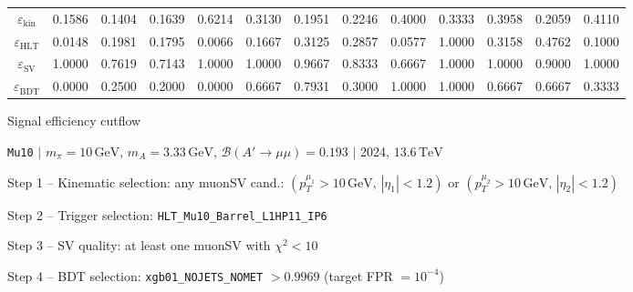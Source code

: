 \documentclass[10pt,a4paper]{article}
\begin{document}
\begin{landscape}
{\begin{tabular}{c|cccc|cccc|cccc}
\midrule
$\varepsilon_{\mathrm{kin}}$ & 0.1586 & 0.1404 & 0.1639 & 0.6214 & 0.3130 & 0.1951 & 0.2246 & 0.4000 & 0.3333 & 0.3958 & 0.2059 & 0.4110\\
$\varepsilon_{\mathrm{HLT}}$ & 0.0148 & 0.1981 & 0.1795 & 0.0066 & 0.1667 & 0.3125 & 0.2857 & 0.0577 & 1.0000 & 0.3158 & 0.4762 & 0.1000\\
$\varepsilon_{\mathrm{SV}}$ & 1.0000 & 0.7619 & 0.7143 & 1.0000 & 1.0000 & 0.9667 & 0.8333 & 0.6667 & 1.0000 & 1.0000 & 0.9000 & 1.0000\\
$\varepsilon_{\mathrm{BDT}}$ & 0.0000 & 0.2500 & 0.2000 & 0.0000 & 0.6667 & 0.7931 & 0.3000 & 1.0000 & 1.0000 & 0.6667 & 0.6667 & 0.3333\\
\bottomrule
\end{tabular}}

\end{landscape}
\clearpage

{\large Signal efficiency cutflow

 \texttt{Mu10} $|$ $m_{\pi}=10\,\mathrm{GeV}$, $m_{A}=3.33\,\mathrm{GeV}$, $\mathcal{B}(A'\!\to\!\mu\mu)=0.193$ $|$ 2024, $13.6\,\mathrm{TeV}$}

\vspace{0.8em}

Step 1 -- Kinematic selection: any muonSV cand.: $(p_T^{\mu_1}{>}10\,\mathrm{GeV},\,|\eta_1|{<}1.2)$ or $(p_T^{\mu_2}{>}10\,\mathrm{GeV},\,|\eta_2|{<}1.2)$

Step 2 -- Trigger selection: \texttt{HLT\_Mu10\_Barrel\_L1HP11\_IP6}

Step 3 -- SV quality: at least one muonSV with $\chi^2<10$

Step 4 -- BDT selection: \texttt{xgb01\_NOJETS\_NOMET} $>0.9969$ (target FPR $=10^{-4}$)

\vspace{0.8em}
\end{document}
